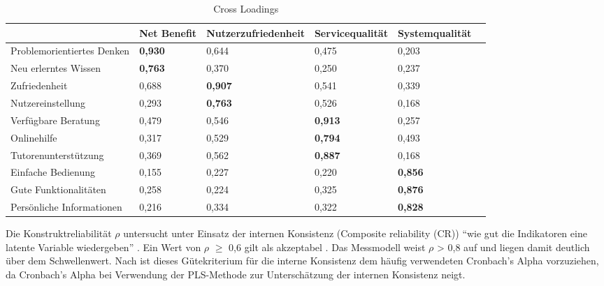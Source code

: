 \begin{table}[h] 
\footnotesize
\caption{Cross Loadings}
\label{tab:Cross-Loadings} 
\begin{tabular}{@{}llllll@{}} \toprule

 & \textbf{Net Benefit} & \textbf{Nutzerzufriedenheit} & \textbf{Servicequalität} & \textbf{Systemqualität} \\ \midrule

Problemorientiertes Denken 	& \textbf{0,930}	& 0,644	& 0,475	& 0,203	\\

Neu erlerntes Wissen	& \textbf{0,763}	& 0,370 	& 0,250 	& 0,237	\\ 

Zufriedenheit 			& 0,688 		& \textbf{0,907} & 0,541	& 0,339	\\

Nutzereinstellung		& 0,293		& \textbf{0,763}	 & 0,526 & 0,168 \\
 
Verfügbare Beratung		& 0,479 		& 0,546 	&\textbf{0,913}	& 0,257		\\

Onlinehilfe 			& 0,317 		& 0,529	& \textbf{0,794}	& 0,493 		\\

Tutorenunterstützung	& 0,369 		& 0,562 	& \textbf{0,887}	& 0,168		\\ 

Einfache Bedienung		& 0,155 		& 0,227 	& 0,220	& \textbf{0,856}	\\ 

Gute Funktionalitäten 	& 0,258 		& 0,224	& 0,325	& \textbf{0,876} 		\\ 
 
Persönliche Informationen & 0,216 	& 0,334 	& 0,322	& \textbf{0,828}	\\	
		 
 \bottomrule
 
\end{tabular}	
\end{table}



Die Konstruktreliabilität $\rho$ untersucht unter Einsatz der internen Konsistenz (Composite reliability (CR)) "`wie gut die Indikatoren eine latente Variable wiedergeben"' \parencite[S.25]{nitzl2010anwenderorientierte}. Ein Wert von $\rho$ $\geq$ 0,6 gilt als akzeptabel \parencite[vgl.][S.212]{ringle2007beurteilung}. Das Messmodell weist $\rho$ > 0,8 auf und liegen damit deutlich über dem Schwellenwert. Nach \textcite[S.320]{chin1998partial} ist dieses Gütekriterium für die interne Konsistenz dem häufig verwendeten Cronbach's Alpha vorzuziehen, da  Cronbach's Alpha bei Verwendung der PLS-Methode zur Unterschätzung der internen Konsistenz neigt.     

